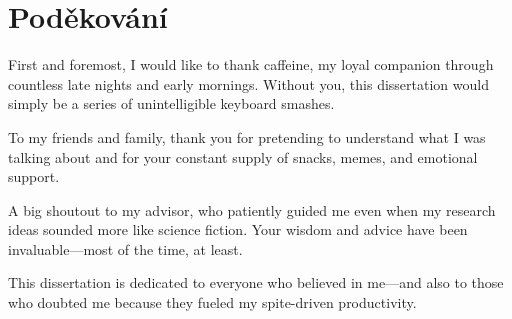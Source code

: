 \section*{Poděkování}
\par First and foremost, I would like to thank caffeine, my loyal companion through countless late nights and early mornings. Without you, this dissertation would simply be a series of unintelligible keyboard smashes.
\par To my friends and family, thank you for pretending to understand what I was talking about and for your constant supply of snacks, memes, and emotional support.
\par A big shoutout to my advisor, who patiently guided me even when my research ideas sounded more like science fiction. Your wisdom and advice have been invaluable—most of the time, at least.
\par This dissertation is dedicated to everyone who believed in me—and also to those who doubted me because they fueled my spite-driven productivity.